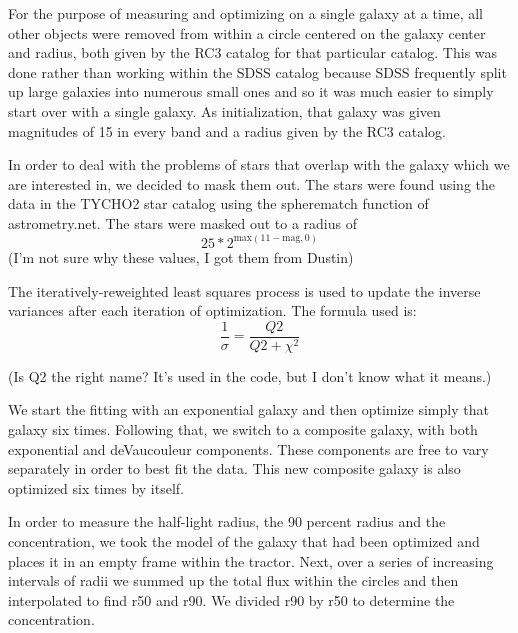 \documentclass{article}
\begin{document}
For the purpose of measuring and optimizing on a single galaxy at a time, all other objects were removed from within a circle centered on the galaxy center and radius, both given by the RC3 catalog for that particular catalog. This was done rather than working within the SDSS catalog because SDSS frequently split up large galaxies into numerous small ones and so it was much easier to simply start over with a single galaxy. As initialization, that galaxy was given magnitudes of 15 in every band and a radius given by the RC3 catalog.

In order to deal with the problems of stars that overlap with the galaxy which we are interested in, we decided to mask them out. The stars were found using the data in the TYCHO2 star catalog using the spherematch function of astrometry.net. The stars were masked out to a radius of \begin{equation}25*2^{\text{max}(11-\text{mag},0)}\end{equation} (I'm not sure why these values, I got them from Dustin)

The iteratively-reweighted least squares process is used to update the inverse variances after each iteration of optimization. The formula used is: \begin{equation}
\frac{1}{\sigma}=\frac{Q2}{Q2+\chi^2}
\end{equation}

(Is Q2 the right name? It's used in the code, but I don't know what it means.)

We start the fitting with an exponential galaxy and then optimize simply that galaxy six times. Following that, we switch to a composite galaxy, with both exponential and deVaucouleur components. These components are free to vary separately in order to best fit the data. This new composite galaxy is also optimized six times by itself.

In order to measure the half-light radius, the 90 percent radius and the concentration, we took the model of the galaxy that had been optimized and places it in an empty frame within the tractor. Next, over a series of increasing intervals of radii we summed up the total flux within the circles and then interpolated to find r50 and r90. We divided r90 by r50 to determine the concentration.
\end{document}
